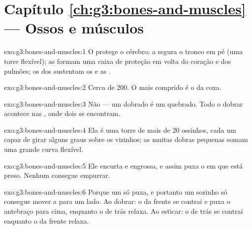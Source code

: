 \section*{Capítulo \ref{ch:g3:bones-and-muscles} --- Ossos e músculos}

\begin{solution}{exo:g3:bones-and-muscles:1}
O  protege o cérebro; a  segura o tronco em pé (uma
torre flexível); as  formam uma caixa de proteção em volta
do coração e dos pulmões; os  dos  sustentam os  e
as .
\end{solution}

\begin{solution}{exo:g3:bones-and-muscles:2}
Cerca de $200$. O mais comprido é o  da coxa.
\end{solution}

\begin{solution}{exo:g3:bones-and-muscles:3}
Não --- um  dobrado é um  quebrado. Todo o dobrar acontece
nas , onde dois  se encontram.
\end{solution}

\begin{solution}{exo:g3:bones-and-muscles:4}
Ela é uma torre de mais de $20$ ossinhos, cada um capaz de girar
alguns graus sobre os vizinhos; as muitas dobras pequenas somam uma
grande curva flexível.
\end{solution}

\begin{solution}{exo:g3:bones-and-muscles:5}
Ele encurta e engrossa, e assim puxa o  em que está preso.
Nenhum  consegue empurrar.
\end{solution}

\begin{solution}{exo:g3:bones-and-muscles:6}
Porque um  só puxa, e portanto um  sozinho só
consegue mover a  para um lado. Ao dobrar: o  da
frente se contrai e puxa o antebraço para cima, enquanto o de trás
relaxa. Ao esticar: o  de trás se contrai enquanto o da
frente relaxa.
\end{solution}

